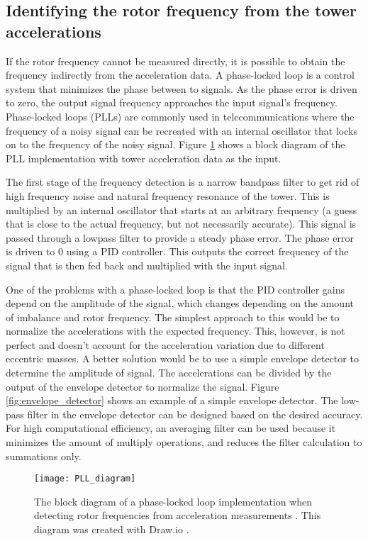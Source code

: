 \subsection{Identifying the rotor frequency from the tower accelerations}
If the rotor frequency cannot be measured directly, it is possible to obtain the frequency indirectly from the acceleration data.  A phase-locked loop is a control system that minimizes the phase between to signals.  As the phase error is driven to zero, the output signal frequency approaches the input signal's frequency.  Phase-locked loops (PLLs) are commonly used in telecommunications where the frequency of a noisy signal can be recreated with an internal oscillator that locks on to the frequency of the noisy signal.  Figure \ref{fig:PLL_diagram} shows a block diagram of the PLL implementation with tower acceleration data as the input.

The first stage of the frequency detection is a narrow bandpass filter to get rid of high frequency noise and natural frequency resonance of the tower.  This is multiplied by an internal oscillator that starts at an arbitrary frequency (a guess that is close to the actual frequency, but not necessarily accurate).  This signal is passed through a lowpass filter to provide a steady phase error.  The phase error is driven to 0 using a PID controller.  This outputs the correct frequency of the signal that is then fed back and multiplied with the input signal.

One of the problems with a phase-locked loop is that the PID controller gains depend on the amplitude of the signal, which changes depending on the amount of imbalance and rotor frequency.  The simplest approach to this would be to normalize the accelerations with the expected frequency.  This, however, is not perfect and doesn't account for the acceleration variation due to different eccentric masses.  A better solution would be to use a simple envelope detector to determine the amplitude of signal.  The accelerations can be divided by the output of the envelope detector to normalize the signal.  Figure \ref{fig:envelope_detector} shows an example of a simple envelope detector\cite{envelope_detector_ref}.  The low-pass filter in the envelope detector can be designed based on the desired accuracy.  For high computational efficiency, an averaging filter can be used because it minimizes the amount of multiply operations, and reduces the filter calculation to summations only.

\begin{figure}
	\centering
	\texttt{[image: PLL\_diagram]}
	\decoRule
	\caption{The block diagram of a phase-locked loop implementation when detecting rotor frequencies from acceleration measurements \cite{embedded_zoom_fft}.  This diagram was created with Draw.io \cite{draw_io}.}
	\label{fig:PLL_diagram}
\end{figure}

